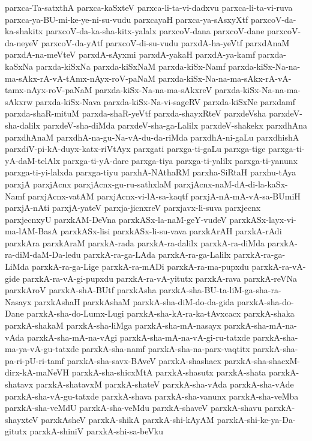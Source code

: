 {parxca-Ta-satxthA
parxca-kaSxteV
parxca-li-ta-vi-dadxvu
parxca-li-ta-vi-ruva
parxca-ya-BU-mi-ke-ye-ni-su-vudu
parxcayaH
parxca-ya-sAsxyXtf
parxcoV-da-ka-shakitx
parxcoV-da-ka-sha-kitx-yalalx
parxcoV-dana
parxcoV-dane
parxcoV-da-neyeV
parxcoV-da-yAtf
parxcoV-di-su-vudu
parxdA-ha-yeVtf
parxdAnaM
parxdA-na-meVteV
parxdA-sAyxmi
parxdA-yakaH
parxdA-ya-kamf
parxda-kaSxNa
parxda-kiSxNa
parxda-kiSxNaM
parxda-kiSx-Namf
parxda-kiSx-Na-na-ma-sAkx-rA-vA-tAmx-nAyx-roV-paNaM
parxda-kiSx-Na-na-ma-sAkx-rA-vA-tamx-nAyx-roV-paNaM
parxda-kiSx-Na-na-ma-sAkxreV
parxda-kiSx-Na-na-ma-sAkxrw
parxda-kiSx-Nava
parxda-kiSx-Na-vi-sageRV
parxda-kiSxNe
parxdamf
parxda-shaR-mituM
parxda-shaR-yeVtf
parxda-shayxRteV
parxdeVsha
parxdeV-sha-dalilx
parxdeV-sha-diMda
parxdeV-sha-ga-Lalilx
parxdeV-shakekx
parxdhAna
parxdhAnaM
parxdhA-na-gu-Na-vA-du-da-riMda
parxdhA-ni-gaLu
parxdhishA
parxdiV-pi-kA-duyx-katx-riVtAyx
parxgati
parxga-ti-gaLu
parxga-tige
parxga-ti-yA-daM-telAlx
parxga-ti-yA-dare
parxga-tiya
parxga-ti-yalilx
parxga-ti-yanunx
parxga-ti-yi-lalxda
parxga-tiyu
parxhA-NAthaRM
parxha-SiRtaH
parxhu-tAya
parxjA
parxjAcnx
parxjAcnx-gu-ru-sathxlaM
parxjAcnx-naM-dA-di-la-kaSx-Namf
parxjAcnx-vatAM
parxjAcnx-vi-lA-sa-kaqtf
parxjA-nA-mA-vA-sa-BUmiH
parxjA-nAti
parxjA-yateV
parxja-jicnxreV
parxjavx-li-suva
parxjecnx
parxjecnxyU
parxkAM-DeVna
parxkASx-la-naM-geY-vudeV
parxkASx-layx-vi-ma-lAM-BasA
parxkASx-lisi
parxkASx-li-su-vava
parxkArAH
parxkA-rAdi
parxkAra
parxkAraM
parxkA-rada
parxkA-ra-dalilx
parxkA-ra-diMda
parxkA-ra-diM-daM-Da-ledu
parxkA-ra-ga-LAda
parxkA-ra-ga-Lalilx
parxkA-ra-ga-LiMda
parxkA-ra-ga-Lige
parxkA-ra-mADi
parxkA-ra-ma-pupxdu
parxkA-ra-vA-gide
parxkA-ra-vA-gi-pupxdu
parxkA-ra-vA-yitutx
parxkA-rava
parxkA-reVNa
parxkAroV
parxkA-shA-BUtf
parxkAsha
parxkA-sha-BU-ta-liM-ga-sha-ra-Nasayx
parxkAshaH
parxkAshaM
parxkA-sha-diM-do-da-gida
parxkA-sha-do-Dane
parxkA-sha-do-Lumx-Lugi
parxkA-sha-kA-ra-ka-tAvxcacx
parxkA-shaka
parxkA-shakaM
parxkA-sha-liMga
parxkA-sha-mA-nasayx
parxkA-sha-mA-na-vAda
parxkA-sha-mA-na-vAgi
parxkA-sha-mA-na-vA-gi-ru-tatxde
parxkA-sha-ma-ya-vA-gu-tatxde
parxkA-sha-namf
parxkA-sha-na-parx-vaqtitx
parxkA-sha-pa-ri-pU-ri-tamf
parxkA-sha-savx-BAveV
parxkA-shashacx
parxkA-sha-shacxM-dirx-kA-maNeVH
parxkA-sha-shicxMtA
parxkA-shasutx
parxkA-shata
parxkA-shatavx
parxkA-shatavxM
parxkA-shateV
parxkA-sha-vAda
parxkA-sha-vAde
parxkA-sha-vA-gu-tatxde
parxkA-shava
parxkA-sha-vanunx
parxkA-sha-veMba
parxkA-sha-veMdU
parxkA-sha-veMdu
parxkA-shaveV
parxkA-shavu
parxkA-shayxteV
parxkAsheV
parxkA-shikA
parxkA-shi-kAyAM
parxkA-shi-ke-ya-Da-gitutx
parxkA-shiniV
parxkA-shi-sa-beVku
}
